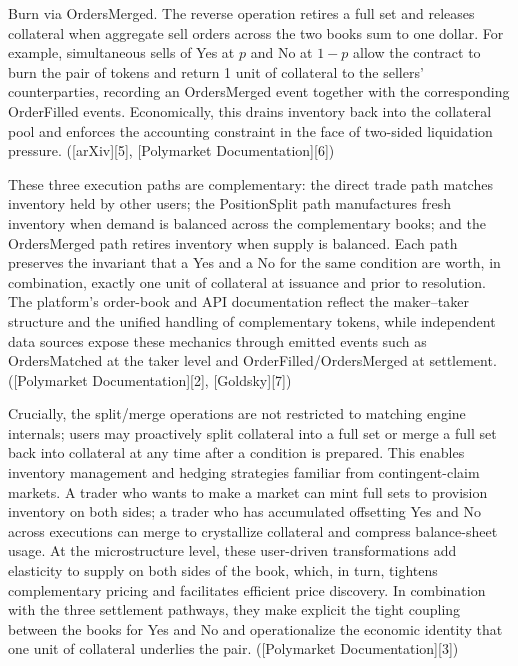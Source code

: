 Burn via OrdersMerged. The reverse operation retires a full set and releases collateral when aggregate sell orders across the two books sum to one dollar. For example, simultaneous sells of Yes at $p$ and No at $1-p$ allow the contract to burn the pair of tokens and return 1 unit of collateral to the sellers’ counterparties, recording an OrdersMerged event together with the corresponding OrderFilled events. Economically, this drains inventory back into the collateral pool and enforces the accounting constraint in the face of two-sided liquidation pressure. ([arXiv][5], [Polymarket Documentation][6])

These three execution paths are complementary: the direct trade path matches inventory held by other users; the PositionSplit path manufactures fresh inventory when demand is balanced across the complementary books; and the OrdersMerged path retires inventory when supply is balanced. Each path preserves the invariant that a Yes and a No for the same condition are worth, in combination, exactly one unit of collateral at issuance and prior to resolution. The platform’s order-book and API documentation reflect the maker–taker structure and the unified handling of complementary tokens, while independent data sources expose these mechanics through emitted events such as OrdersMatched at the taker level and OrderFilled/OrdersMerged at settlement. ([Polymarket Documentation][2], [Goldsky][7])


Crucially, the split/merge operations are not restricted to matching engine internals; users may proactively split collateral into a full set or merge a full set back into collateral at any time after a condition is prepared. This enables inventory management and hedging strategies familiar from contingent-claim markets. A trader who wants to make a market can mint full sets to provision inventory on both sides; a trader who has accumulated offsetting Yes and No across executions can merge to crystallize collateral and compress balance-sheet usage. At the microstructure level, these user-driven transformations add elasticity to supply on both sides of the book, which, in turn, tightens complementary pricing and facilitates efficient price discovery. In combination with the three settlement pathways, they make explicit the tight coupling between the books for Yes and No and operationalize the economic identity that one unit of collateral underlies the pair. ([Polymarket Documentation][3])

